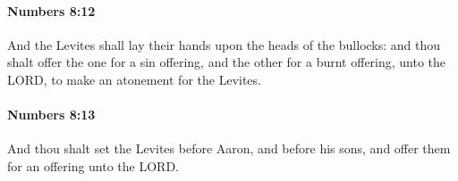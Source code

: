 		\paragraph{Numbers 8:12} %
			\label{NUMBERS-8-12}

			And the Levites shall lay their hands upon the heads of the bullocks: and thou shalt offer the one for a sin offering, and the other for a burnt offering, unto the LORD, to make an atonement for the Levites.


		\paragraph{Numbers 8:13} %
			\label{NUMBERS-8-13}

			And thou shalt set the Levites before Aaron, and before his sons, and offer them for an offering unto the LORD.


